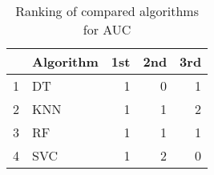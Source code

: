 \begin{table}
\footnotesize
\caption{Ranking of compared algorithms for AUC}
\label{tab:places AUC}
\begin{tabular}{llrrr}
\hline
 & Algorithm & 1st & 2nd & 3rd \\
\hline
1 & DT & 1 & 0 & 1 \\
2 & KNN & 1 & 1 & 2 \\
3 & RF & 1 & 1 & 1 \\
4 & SVC & 1 & 2 & 0 \\
\hline
\end{tabular}
\end{table}
